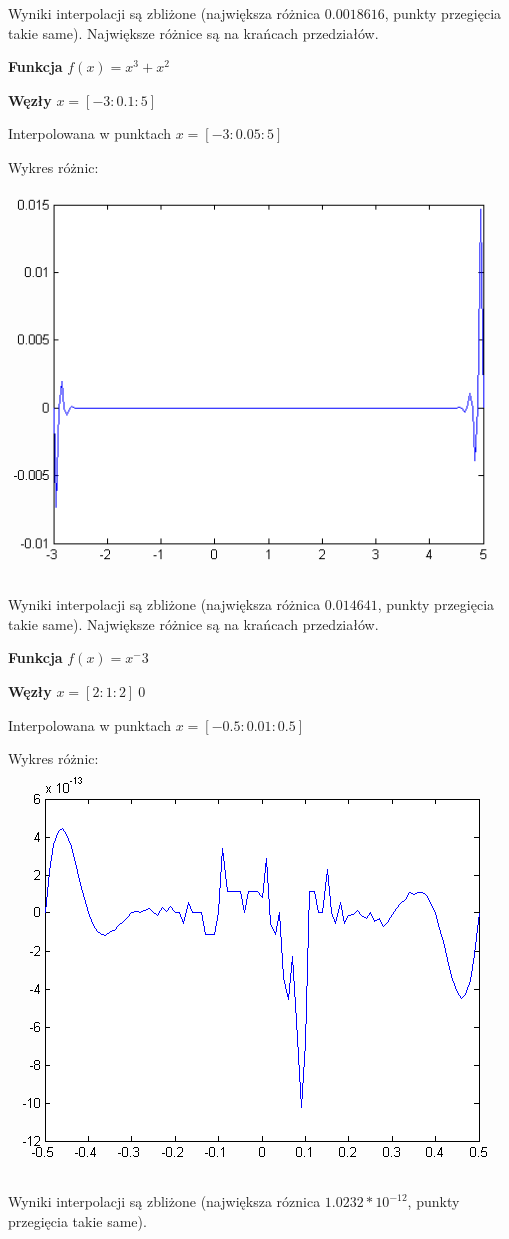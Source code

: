 \documentclass[a4paper,11pt,notitlepage]{article}
\begin{document}
Wyniki interpolacji są zbliżone (największa różnica $0.0018616$, punkty przegięcia takie same). Największe różnice są na krańcach przedziałów.

\vspace{1cm}

\textbf{Funkcja} $f(x) = x^3 + x^2$

\textbf{Węzły} $x = [-3:0.1:5]$

Interpolowana w punktach $x = [-3:0.05:5]$

Wykres różnic:\\
\includegraphics{spline4.png}

Wyniki interpolacji są zbliżone (największa różnica $0.014641$, punkty przegięcia takie same). Największe różnice są na krańcach przedziałów.

\vspace{1cm}

\textbf{Funkcja} $f(x) = x^-3$

\textbf{Węzły} $x = [2:1:2] \ 0$

Interpolowana w punktach $x = [-0.5:0.01:0.5]$

Wykres różnic:\\
\includegraphics{spline5.png}

Wyniki interpolacji są zbliżone (największa róznica $1.0232 * 10^{-12}$, punkty przegięcia takie same).
\end{document}
